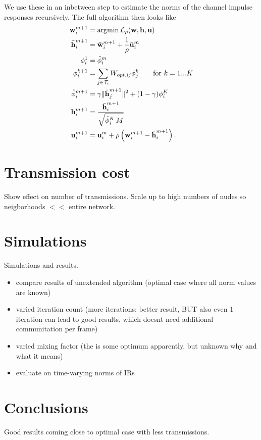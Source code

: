 \documentclass{article}
\begin{document}
We use these in an inbetween step to estimate the norms of the channel impulse responses recursively. The full algorithm then looks like
\begin{align}
  \bm{\mathrm{w}}_i^{m+1} &= \operatorname{argmin} \mathcal{L}_\rho(\bm{\mathrm{w}},\bm{\mathrm{h}},\bm{\mathrm{u}})\\
  \bar{\bm{\mathrm{h}}}_i^{m+1} &= \bar{\bm{\mathrm{w}}}_i^{m+1} + \frac{1}{\rho} \bar{\bm{\mathrm{u}}}_i^m\\
  \phi_i^1 &= \hat{\phi}_i^{m}\\
  \phi_i^{k+1} &= \sum_{j \in \mathcal{T}_i} W_{opt,ij} \phi_j^{k} \qquad\text{for } k=1...K\\
  \hat{\phi}_i^{m+1} &= \gamma \| \bar{\bm{\mathrm{h}}}_j^{m+1} \|^2 + (1-\gamma) \phi_i^K\\
  \bm{\mathrm{h}}_i^{m+1} &= \frac{\bar{\bm{\mathrm{h}}}_i^{m+1}}{\sqrt{\hat{\phi}_i^K\,M}}\\
  \bm{\mathrm{u}}_i^{m+1} &= \bm{\mathrm{u}}_i^{m} + \rho \left(\bm{\mathrm{w}}_i^{m+1} - \tilde{\bm{\mathrm{h}}}_i^{m+1}\right).
\end{align}

\section{Transmission cost}
\label{sec:transcost}
Show effect on number of transmissions. Scale up to high numbers of nudes so neigborhoods \(<<\) entire network.

\section{Simulations}
\label{sec:simulations}
Simulations and results.
\begin{itemize}
  \item compare results of unextended algorithm (optimal case where all norm values are known)
  \item varied iteration count (more iterations: better result, BUT also even 1 iteration can lead to good results, which doesnt need additional communitation per frame)
  \item varied mixing factor (the is some optimum apparently, but unknown why and what it means)
  \item evaluate on time-varying norms of IRs
\end{itemize}


\section[]{Conclusions}
\label{sec:conclusions}
Good results coming close to optimal case with less transmissions.
\end{document}

